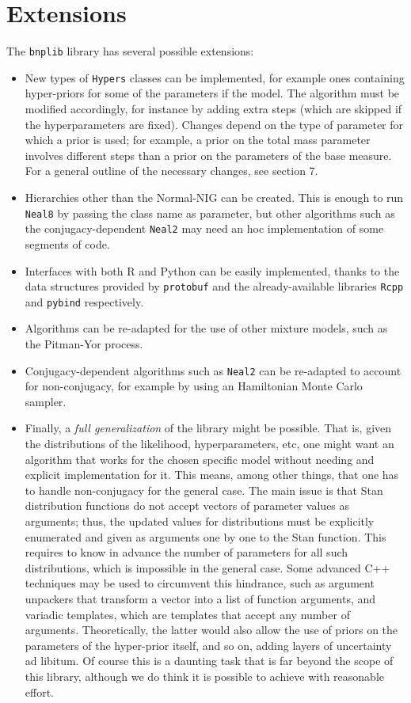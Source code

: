 \section{Extensions} %
The \verb|bnplib| library has several possible extensions:
\begin{itemize}
	\item New types of \verb|Hypers| classes can be implemented, for example ones containing hyper-priors for some of the parameters if the model.
	The algorithm must be modified accordingly, for instance by adding extra steps (which are skipped if the hyperparameters are fixed).
	Changes depend on the type of parameter for which a prior is used; for example, a prior on the total mass parameter involves different steps than a prior on the parameters of the base measure.
	For a general outline of the necessary changes, see \cite{neal} section 7.
	\item Hierarchies other than the Normal-NIG can be created.
	This is enough to run \verb|Neal8| by passing the class name as parameter, but other algorithms such as the conjugacy-dependent \verb|Neal2| may need an hoc implementation of some segments of code. %
	\item Interfaces with both R and Python can be easily implemented, thanks to the data structures provided by \verb|protobuf| and the already-available libraries \verb|Rcpp| and \verb|pybind| respectively.
	\item Algorithms can be re-adapted for the use of other mixture models, such as the Pitman-Yor process. %
	\item Conjugacy-dependent algorithms such as \verb|Neal2| can be re-adapted to account for non-conjugacy, for example by using an Hamiltonian Monte Carlo sampler.
	\item Finally, a \emph{full generalization} of the library might be possible.
	That is, given the distributions of the likelihood, hyperparameters, etc, one might want an algorithm that works for the chosen specific model without needing and explicit implementation for it.
	This means, among other things, that one has to handle non-conjugacy for the general case.
	The main issue is that Stan distribution functions do not accept vectors of parameter values as arguments; thus, the updated values for distributions must be explicitly enumerated and given as arguments one by one to the Stan function.
	This requires to know in advance the number of parameters for all such distributions, which is impossible in the general case.
	Some advanced C++ techniques may be used to circumvent this hindrance, such as argument unpackers that transform a vector into a list of function arguments, and variadic templates, which are templates that accept any number of arguments.
	Theoretically, the latter would also allow the use of priors on the parameters of the hyper-prior itself, and so on, adding layers of uncertainty ad libitum.
	Of course this is a daunting task that is far beyond the scope of this library, although we do think it is possible to achieve with reasonable effort. %
\end{itemize}

